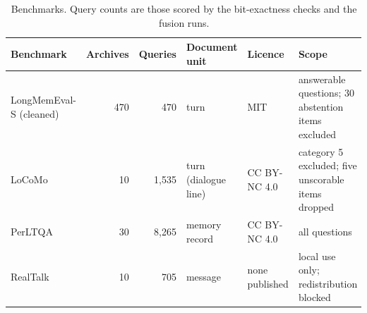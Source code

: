 \begin{table}[tbp]
\centering
\small
\caption{Benchmarks. Query counts are those scored by the bit-exactness checks and the fusion runs.}
\label{tab:benchmarks}
\begin{tabularx}{\linewidth}{@{}l r r l l >{\raggedright\arraybackslash}X@{}}
\toprule
Benchmark & Archives & Queries & Document unit & Licence & Scope \\
\midrule
LongMemEval-S (cleaned) & 470 & 470 & turn & MIT & 470 answerable questions; 30 abstention items excluded \\
LoCoMo & 10 & 1{,}535 & turn (dialogue line) & CC BY-NC 4.0 & category 5 excluded; five unscorable items dropped \\
PerLTQA & 30 & 8{,}265 & memory record & CC BY-NC 4.0 & all questions \\
RealTalk & 10 & 705 & message & none published & local use only; redistribution blocked \\
\bottomrule
\end{tabularx}
\end{table}

